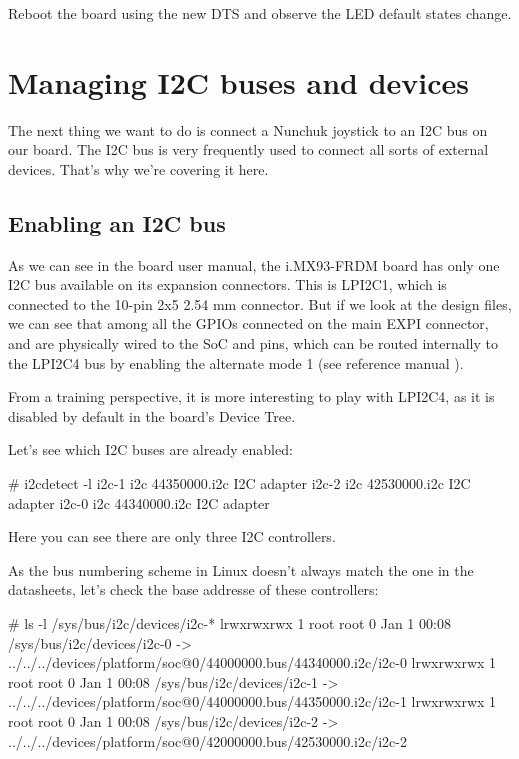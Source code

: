 Reboot the board using the new DTS and observe the LED default states
change.

\section{Managing I2C buses and devices}

The next thing we want to do is connect a Nunchuk joystick
to an I2C bus on our board. The I2C bus is very frequently used
to connect all sorts of external devices. That's why we're covering
it here.

\subsection{Enabling an I2C bus}

As we can see in the board user manual, the i.MX93-FRDM board has
only one I2C bus available on its expansion connectors. This is LPI2C1,
which is connected to the 10-pin 2x5 2.54 mm connector. But if we look
at the design files, we can see that among all the GPIOs connected on the main
EXPI connector,  and  are physically
wired to the SoC  and  pins, which can be routed
internally to the LPI2C4 bus by enabling the alternate mode 1 (see reference
manual ).

From a training perspective, it is more interesting to play with LPI2C4, as it
is disabled by default in the board's Device Tree.

Let's see which I2C buses are already enabled:

\begin{bashinput}
# i2cdetect -l
i2c-1	i2c       	44350000.i2c                    	I2C adapter
i2c-2	i2c       	42530000.i2c                    	I2C adapter
i2c-0	i2c       	44340000.i2c                    	I2C adapter

\end{bashinput}

Here you can see there are only three I2C controllers.

As the bus numbering scheme in Linux doesn't always match the one
in the datasheets, let's check the base addresse of these controllers:

\begin{bashinput}
# ls -l /sys/bus/i2c/devices/i2c-*
lrwxrwxrwx    1 root     root             0 Jan  1 00:08 /sys/bus/i2c/devices/i2c-0 -> ../../../devices/platform/soc@0/44000000.bus/44340000.i2c/i2c-0
lrwxrwxrwx    1 root     root             0 Jan  1 00:08 /sys/bus/i2c/devices/i2c-1 -> ../../../devices/platform/soc@0/44000000.bus/44350000.i2c/i2c-1
lrwxrwxrwx    1 root     root             0 Jan  1 00:08 /sys/bus/i2c/devices/i2c-2 -> ../../../devices/platform/soc@0/42000000.bus/42530000.i2c/i2c-2

\end{bashinput}

